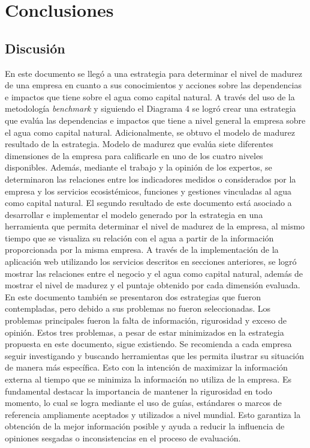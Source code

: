 \section{Conclusiones}
\subsection{Discusión}
En este documento se llegó a una estrategia para determinar el nivel de madurez de una empresa en cuanto a sus conocimientos y acciones sobre las dependencias e impactos que tiene sobre el agua como capital natural. A través del uso de la metodología \textit{benchmark} y siguiendo el Diagrama 4 se logró crear una estrategia que evalúa las dependencias e impactos que tiene a nivel general la empresa sobre el agua como capital natural. Adicionalmente, se obtuvo el modelo de madurez resultado de la estrategia. Modelo de madurez que evalúa siete diferentes dimensiones de la empresa para calificarle en uno de los cuatro niveles disponibles. Además, mediante el trabajo y la opinión de los expertos, se determinaron las relaciones entre los indicadores medidos o considerados por la empresa y los servicios ecosistémicos, funciones y gestiones vinculadas al agua como capital natural. El segundo resultado de este documento está asociado a desarrollar e implementar el modelo generado por la estrategia en una herramienta que permita determinar el nivel de madurez de la empresa, al mismo tiempo que se visualiza su relación con el agua a partir de la información proporcionada por la misma empresa. A través de la implementación de la aplicación web utilizando los servicios descritos en secciones anteriores, se logró mostrar las relaciones entre el negocio y el agua como capital natural, además de mostrar el nivel de madurez y el puntaje obtenido por cada dimensión evaluada. 
En este documento también se presentaron dos estrategias que fueron contempladas, pero debido a sus problemas no fueron seleccionadas. Los problemas principales fueron la falta de información, rigurosidad y exceso de opinión. Estos tres problemas, a pesar de estar minimizados en la estrategia propuesta en este documento, sigue existiendo. Se recomienda a cada empresa seguir investigando y buscando herramientas que les permita ilustrar su situación de manera más específica. Esto con la intención de maximizar la información externa al tiempo que se minimiza la información no utiliza de la empresa. Es fundamental destacar la importancia de mantener la rigurosidad en todo momento, lo cual se logra mediante el uso de guías, estándares o marcos de referencia ampliamente aceptados y utilizados a nivel mundial. Esto garantiza la obtención de la mejor información posible y ayuda a reducir la influencia de opiniones sesgadas o inconsistencias en el proceso de evaluación.

